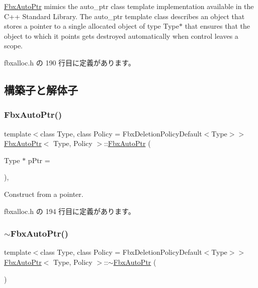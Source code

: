 \hyperlink{class_fbx_auto_ptr}{Fbx\+Auto\+Ptr} mimics the {\ttfamily auto\+\_\+ptr} class template implementation available in the C++ Standard Library. The {\ttfamily auto\+\_\+ptr} template class describes an object that stores a pointer to a single allocated object of type Type$\ast$ that ensures that the object to which it points gets destroyed automatically when control leaves a scope. 

 fbxalloc.\+h の 190 行目に定義があります。



\subsection{構築子と解体子}
\mbox{\label{class_fbx_auto_ptr_ae988d5760ee4926a4a10d76c37b378fc}} 
\subsubsection{\texorpdfstring{Fbx\+Auto\+Ptr()}{FbxAutoPtr()}}
{\footnotesize\ttfamily template$<$class Type, class Policy = Fbx\+Deletion\+Policy\+Default$<$\+Type$>$$>$ \\
\hyperlink{class_fbx_auto_ptr}{Fbx\+Auto\+Ptr}$<$ Type, Policy $>$\+::\hyperlink{class_fbx_auto_ptr}{Fbx\+Auto\+Ptr} (\begin{DoxyParamCaption}\item[{Type $\ast$}]{p\+Ptr = {} }\end{DoxyParamCaption})\hspace{0.3cm}{\ttfamily [inline]}, {\ttfamily [explicit]}}



Construct from a pointer. 



 fbxalloc.\+h の 194 行目に定義があります。

\mbox{\label{class_fbx_auto_ptr_aa185a3ac9d0cc7b8c2b04825f3ea73ee}} 
\subsubsection{\texorpdfstring{$\sim$\+Fbx\+Auto\+Ptr()}{~FbxAutoPtr()}}
{\footnotesize\ttfamily template$<$class Type, class Policy = Fbx\+Deletion\+Policy\+Default$<$\+Type$>$$>$ \\
\hyperlink{class_fbx_auto_ptr}{Fbx\+Auto\+Ptr}$<$ Type, Policy $>$\+::$\sim$\hyperlink{class_fbx_auto_ptr}{Fbx\+Auto\+Ptr} (\begin{DoxyParamCaption}{ }\end{DoxyParamCaption})\hspace{0.3cm}{\ttfamily [inline]}}



